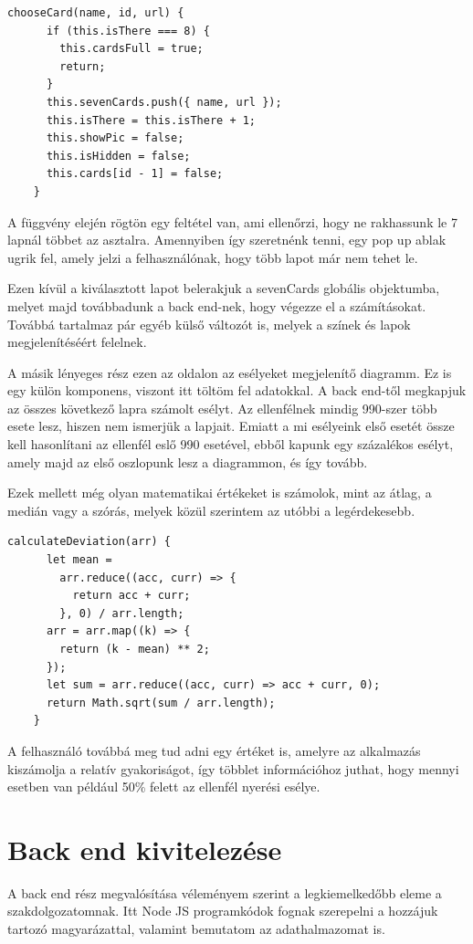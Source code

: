\begin{lstlisting}[style=htmlcssjs]
    chooseCard(name, id, url) {
      if (this.isThere === 8) {
        this.cardsFull = true;
        return;
      }
      this.sevenCards.push({ name, url });
      this.isThere = this.isThere + 1;
      this.showPic = false;
      this.isHidden = false;
      this.cards[id - 1] = false;
    }
\end{lstlisting}

A függvény elején rögtön egy feltétel van, ami ellenőrzi, hogy ne rakhassunk le 7 lapnál többet az asztalra. Amennyiben így szeretnénk tenni, egy pop up ablak ugrik fel, amely jelzi a felhasználónak, hogy több lapot már nem tehet le.

Ezen kívül a kiválasztott lapot belerakjuk a sevenCards globális objektumba, melyet majd továbbadunk a back end-nek, hogy végezze el a számításokat. Továbbá tartalmaz pár egyéb külső változót is, melyek a színek és lapok megjelenítéséért felelnek.

A másik lényeges rész ezen az oldalon az esélyeket megjelenítő diagramm. Ez is egy külön komponens, viszont itt töltöm fel adatokkal. A back end-től megkapjuk az összes következő lapra számolt esélyt. Az ellenfélnek mindig 990-szer több esete lesz, hiszen nem ismerjük a lapjait. Emiatt a mi esélyeink első esetét össze kell hasonlítani az ellenfél eslő 990 esetével, ebből kapunk egy százalékos esélyt, amely majd az első oszlopunk lesz a diagrammon, és így tovább. 

Ezek mellett még olyan matematikai értékeket is számolok, mint az átlag, a medián vagy a szórás, melyek közül szerintem az utóbbi a legérdekesebb.

\begin{lstlisting}[style=htmlcssjs]
    calculateDeviation(arr) {
      let mean =
        arr.reduce((acc, curr) => {
          return acc + curr;
        }, 0) / arr.length;
      arr = arr.map((k) => {
        return (k - mean) ** 2;
      });
      let sum = arr.reduce((acc, curr) => acc + curr, 0);
      return Math.sqrt(sum / arr.length);
    }
\end{lstlisting}

A felhasználó továbbá meg tud adni egy értéket is, amelyre az alkalmazás kiszámolja a relatív gyakoriságot, így többlet információhoz juthat, hogy mennyi esetben van például 50\% felett az ellenfél nyerési esélye.

\section{Back end kivitelezése}
A back end rész megvalósítása véleményem szerint a legkiemelkedőbb eleme a szakdolgozatomnak. Itt Node JS programkódok fognak szerepelni a hozzájuk tartozó magyarázattal, valamint bemutatom az adathalmazomat is.

